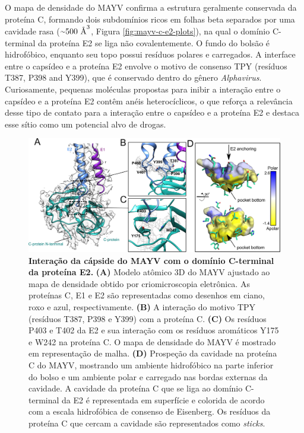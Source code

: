 \documentclass[Portugues]{phdquali}
\newcommand{\mAA}{~\text{\AA}}
\newcommand{\aproximadamente}{\raise.2ex\hbox{$\scriptstyle\sim$}}
\begin{document}
O mapa de densidade do MAYV confirma a estrutura geralmente conservada da proteína C, formando dois subdomínios ricos em folhas beta separados por uma cavidade rasa ($\aproximadamente500 \mAA^3$, Figura \ref{fig:mayv-c-e2-plots}), na qual o domínio C-terminal da proteína E2 se liga não covalentemente. O fundo do bolsão é hidrofóbico, enquanto seu topo possui resíduos polares e carregados. A interface entre o capsídeo e a proteína E2 envolve o motivo de consenso TPY (resíduos T387, P398 and Y399), que é conservado dentro do gênero \textit{Alphavirus}. Curiosamente, pequenas moléculas propostas para inibir a interação entre o capsídeo e a proteína E2 contêm anéis heterocíclicos, o que reforça a relevância desse tipo de contato para a interação entre o capsídeo e a proteína E2 e destaca esse sítio como um potencial alvo de drogas.

\begin{figure}[t]
  \centerline{\includegraphics[scale=0.2]{images/mayv-c-e2-analysis.png}}
  \caption[Interação da cápside do MAYV com o domínio C-terminal da proteína E2]{\textbf{Interação da cápside do MAYV com o domínio C-terminal da proteína E2.} \textbf{(A)} Modelo atômico 3D do MAYV ajustado ao mapa de densidade obtido por criomicroscopia eletrônica. As proteínas C, E1 e E2 são representadas como desenhos em ciano, roxo e azul, respectivamente. \textbf{(B)} A interação do motivo TPY (resíduos T387, P398 e Y399) com a proteína C. \textbf{(C)} Os resíduos P403 e T402 da E2 e sua interação com os resíduos aromáticos Y175 e W242 na proteína C. O mapa de densidade do MAYV é mostrado em representação de malha. \textbf{(D)} Prospeção da cavidade na proteína C do MAYV, mostrando um ambiente hidrofóbico na parte inferior do bolso e um ambiente polar e carregado nas bordas externas da cavidade. A cavidade da proteína C que se liga ao domínio C-terminal da E2 é representada em superfície e colorida de acordo com a escala hidrofóbica de consenso de Eisenberg. Os resíduos da proteína C que cercam a cavidade são representados como \textit{sticks}.}
  \label{fig:mayv-c-e2-analysis}
\end{figure}
\end{document}
